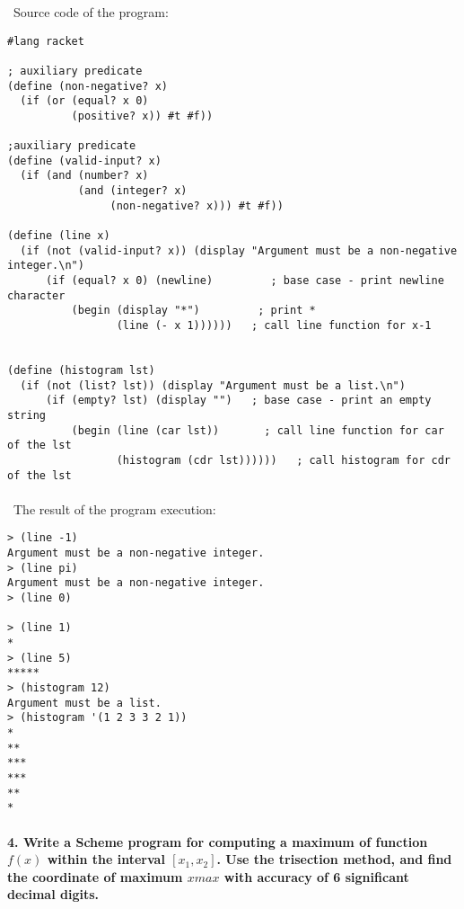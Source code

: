 \documentclass{article}
\begin{document}
\paragraph{}\
\paragraph{}\
\paragraph{}\
Source code of the program:

\begin{verbatim} 
#lang racket

; auxiliary predicate
(define (non-negative? x)
  (if (or (equal? x 0)
          (positive? x)) #t #f))

;auxiliary predicate
(define (valid-input? x)
  (if (and (number? x)
           (and (integer? x)
                (non-negative? x))) #t #f))

(define (line x)
  (if (not (valid-input? x)) (display "Argument must be a non-negative integer.\n")
      (if (equal? x 0) (newline)	     ; base case - print newline character
          (begin (display "*")	       ; print *
                 (line (- x 1))))))	  ; call line function for x-1

      
(define (histogram lst)
  (if (not (list? lst)) (display "Argument must be a list.\n")
      (if (empty? lst) (display "")	  ; base case - print an empty string
          (begin (line (car lst))	    ; call line function for car of the lst
                 (histogram (cdr lst))))))   ; call histogram for cdr of the lst      
\end{verbatim}

\paragraph{}\
	The result of the program execution:
	
\begin{verbatim} 
> (line -1)
Argument must be a non-negative integer.
> (line pi)
Argument must be a non-negative integer.
> (line 0)

> (line 1)
*
> (line 5)
*****
> (histogram 12)
Argument must be a list.
> (histogram '(1 2 3 3 2 1))
*
**
***
***
**
*
\end{verbatim}

\paragraph{4. Write a Scheme program for computing a maximum of function \(f(x)\) within the interval \([x_1, x_2]\). Use the trisection method, and find the coordinate of maximum \(xmax\) with accuracy of 6 significant decimal digits.}\
\end{document}
